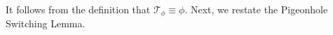
\medskip
It follows from the definition that $\mathcal{T}_{\phi} \equiv \phi$. 
Next, we restate the Pigeonhole Switching Lemma.

\medskip

